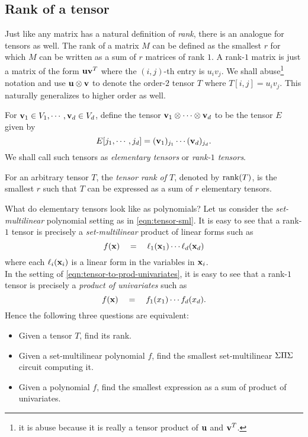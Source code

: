 \subsection{Rank of a tensor}

Just like any matrix has a natural definition of \emph{rank}, there is an analogue for tensors as well.
The rank of a matrix $M$ can be defined as the smallest $r$ for which $M$ can be written as a sum of $r$ matrices of rank $1$.
A rank-$1$ matrix is just a matrix of the form $\mathbf{u} \mathbf{v}^T$ where the $(i,j)$-th entry is $u_iv_j$.
We shall abuse\footnote{it is abuse because it is really a tensor product of $\mathbf{u}$ and $\mathbf{v}^T$.}
notation and use $\mathbf{u} \otimes \mathbf{v}$ to denote the order-$2$ tensor $T$ where $T[i,j] = u_i v_j$.
This naturally generalizes to higher order as well.

\begin{definition}
  For $\mathbf{v}_1\in V_1, \cdots, \mathbf{v}_d \in V_d$, define the tensor $\mathbf{v}_1 \otimes \cdots \otimes \mathbf{v}_d$ to be the tensor $E$ given by
\[
E[j_1,\cdots, j_d] = (\mathbf{v}_1)_{j_1} \cdots (\mathbf{v}_d)_{j_d}.
\]
We shall call such tensors as \emph{elementary tensors} or \emph{rank-$1$ tensors}. 

For an arbitrary tensor $T$, the \emph{tensor rank of $T$}, denoted by $\operatorname{rank}(T)$, is the smallest $r$ such that $T$ can be expressed as a sum of $r$ elementary tensors. 
\end{definition}

\noindent 
What do elementary tensors look like as polynomials?
Let us consider the \emph{set-multilinear} polynomial setting as in \eqref{eqn:tensor-sml}.
It is easy to see that a rank-$1$ tensor is precisely a \emph{set-multilinear} product of linear forms such as
\[
f(\mathbf{x}) \quad = \quad \ell_1(\mathbf{x}_1) \cdots \ell_d(\mathbf{x}_d)
\]
where each $\ell_i(\mathbf{x}_i)$ is a linear form in the variables in $\mathbf{x}_i$. \\

In the setting of \eqref{eqn:tensor-to-prod-univariates}, it is easy to see that a rank-$1$ tensor is precisely a \emph{product of univariates} such as
\[
f(\mathbf{x}) \quad = \quad f_1(x_1)\cdots f_d(x_d).
\]
\noindent
Hence the following three questions are equivalent:
\begin{itemize}
\setlength\itemsep{0em}
\item Given a tensor $T$, find its rank. 
\item Given a set-multilinear polynomial $f$, find the smallest set-multilinear $\Sigma\Pi\Sigma$ circuit computing it. 
\item Given a polynomial $f$, find the smallest expression as a sum of product of univariates.
\end{itemize}

